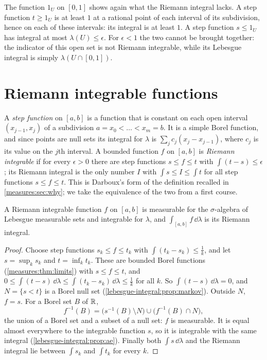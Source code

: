 \begin{notechapter}
\begin{example}
The function $1_U$ on $[0, 1]$ shows again what the Riemann integral
lacks. A step function $t\geq1_U$ is at least $1$ at a rational point
of each interval of its subdivision, hence on each of these intervals:
its integral is at least $1$. A step function $s\leq1_U$ has integral
at most $\lambda(U)\leq\epsilon$. For $\epsilon < 1$ the two cannot be
brought together: the indicator of this open set is not Riemann
integrable, while its Lebesgue integral is simply
$\lambda(U\cap[0, 1])$.
\end{example}

\section{Riemann integrable functions}\label{caratheodory:sec:riemann}

A \emph{step function} on $[a, b]$ is a function that is constant on
each open interval $(x_{j-1}, x_j)$ of a subdivision
$a = x_0 < \dots < x_m = b$. It is a simple Borel function, and since
points are null sets its integral for $\lambda$ is
$\sum_jc_j(x_j - x_{j-1})$, where $c_j$ is its value on the $j$th
interval. A bounded function $f$ on $[a, b]$ is \emph{Riemann
integrable} if for every $\epsilon > 0$ there are step functions
$s\leq f\leq t$ with $\int(t - s)\leq\epsilon$; its Riemann integral
is the only number $I$ with $\int s\leq I\leq\int t$ for all step
functions $s\leq f\leq t$. This is Darboux's form of the definition
recalled in \cref{measures:sec:why}; we take the equivalence of the
two from a first course.

\begin{proposition}\label{caratheodory:prop:riemann}
A Riemann integrable function $f$ on $[a, b]$ is measurable for the
$\sigma$-algebra of Lebesgue measurable sets and integrable for
$\lambda$, and $\int_{[a, b]}f\,\dd\lambda$ is its Riemann integral.
\end{proposition}

\begin{proof}
Choose step functions $s_k\leq f\leq t_k$ with
$\int(t_k - s_k)\leq\frac1k$, and let $s = \sup_ks_k$ and
$t = \inf_kt_k$. These are bounded Borel functions
(\cref{measures:thm:limits}) with $s\leq f\leq t$, and
$0\leq\int(t - s)\,\dd\lambda\leq\int(t_k - s_k)\,\dd\lambda
\leq\frac1k$ for all $k$. So $\int(t - s)\,\dd\lambda = 0$, and
$N = \{s < t\}$ is a Borel null set
(\cref{lebesgue-integral:prop:markov}). Outside $N$, $f = s$. For a
Borel set $B$ of $\mathbb{R}$,
\[
  f^{-1}(B) = \bigl(s^{-1}(B)\setminus N\bigr)
  \cup\bigl(f^{-1}(B)\cap N\bigr) ,
\]
the union of a Borel set and a subset of a null set: $f$ is measurable.
It is equal almost everywhere to the integrable function $s$, so it is
integrable with the same integral
(\cref{lebesgue-integral:prop:ae}). Finally both
$\int s\,\dd\lambda$ and the Riemann integral lie between
$\int s_k$ and $\int t_k$ for every $k$.
\end{proof}


\end{notechapter}
